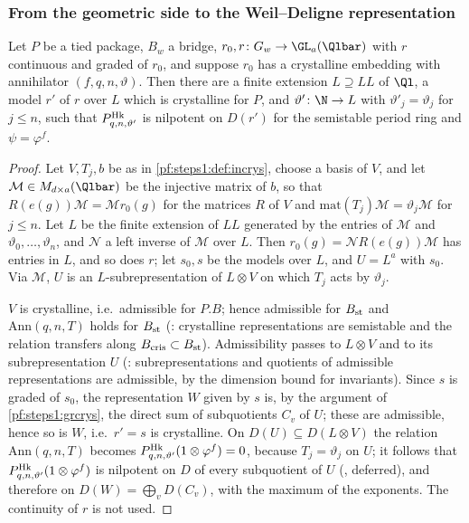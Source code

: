 \subsubsection{From the geometric side to the Weil--Deligne representation}

\begin{proposition}\label{pf:steps1:joinq}
Let $P$ be a tied package, $B_w$ a bridge, $r_0,r\colon G_w\to\GL_a(\Qlbar)$ with $r$ continuous and graded of $r_0$, and suppose $r_0$
has a crystalline embedding with annihilator $(f,q,n,\vartheta)$. Then there are a finite extension $L\supseteq LL$ of
$\Ql$, a model $r'$ of $r$ over $L$ which is crystalline for $P$, and $\vartheta'\colon\N\to L$ with $\vartheta'_j=\vartheta_j$
for $j\le n$, such that $P^{\mathrm{Hk}}_{q,n,\vartheta'}$ is nilpotent on $D(r')$ for the semistable period ring and $\psi=\varphi^f$.
\end{proposition}

\begin{proof}
Let $V,T_j,b$ be as in \cref{pf:steps1:def:incrys}, choose a basis of $V$, and let $\mathcal M\in M_{d\times a}(\Qlbar)$ be the
injective matrix of $b$, so that $R(e(g))\mathcal M=\mathcal Mr_0(g)$ for the matrices $R$ of $V$ and
$\mathrm{mat}(T_j)\mathcal M=\vartheta_j\mathcal M$ for $j\le n$. Let $L$ be the finite extension of $LL$ generated by the
entries of $\mathcal M$ and $\vartheta_0,\dots,\vartheta_n$, and $\mathcal N$ a left inverse of $\mathcal M$ over $L$. Then
$r_0(g)=\mathcal NR(e(g))\mathcal M$ has entries in $L$, and so does $r$; let $s_0,s$ be the models over $L$, and $U=L^a$
with $s_0$. Via $\mathcal M$, $U$ is an $L$-subrepresentation of $L\otimes V$ on which $T_j$ acts by $\vartheta_j$.

$V$ is crystalline, i.e.\ admissible for $P.B$; hence admissible for $B_{\mathrm{st}}$ and $\mathrm{Ann}(q,n,T)$ holds for
$B_{\mathrm{st}}$ (: crystalline representations are semistable and the
relation transfers along $B_{\mathrm{cris}}\subset B_{\mathrm{st}}$). Admissibility passes to $L\otimes V$ and to its subrepresentation $U$
(: subrepresentations and quotients of admissible
representations are admissible, by the dimension bound for invariants). Since $s$ is graded of $s_0$, the representation $W$
given by $s$ is, by the argument of \cref{pf:steps1:grcrys}, the direct sum of subquotients $C_v$ of $U$; these are admissible,
hence so is $W$, i.e.\ $r'=s$ is crystalline. On $D(U)\subseteq D(L\otimes V)$ the relation $\mathrm{Ann}(q,n,T)$ becomes
$P^{\mathrm{Hk}}_{q,n,\vartheta'}(1\otimes\varphi^f)=0$, because $T_j=\vartheta_j$ on $U$; it follows that
$P^{\mathrm{Hk}}_{q,n,\vartheta'}(1\otimes\varphi^f)$ is nilpotent on $D$ of every subquotient of $U$
(, deferred), and therefore on $D(W)=\bigoplus_vD(C_v)$, with the
maximum of the exponents. The continuity of $r$ is not used.
\end{proof}

